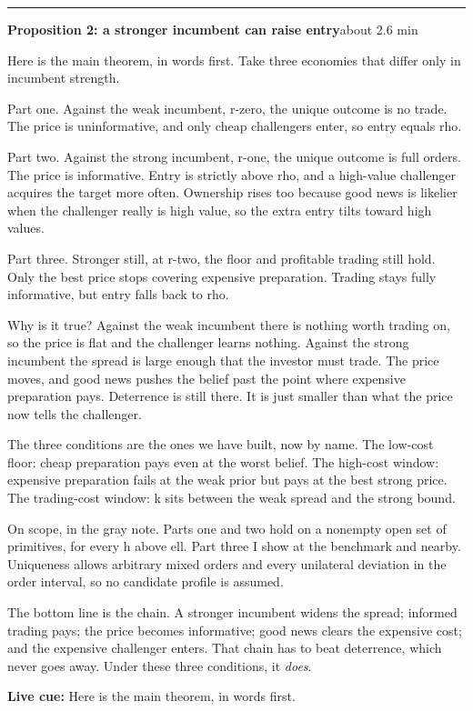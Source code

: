 \documentclass[11pt]{article}
\newcommand{\Cue}[1]{\par\nobreak\smallskip\noindent
  \textcolor{ScriptGray}{\footnotesize\textbf{Live cue:} #1}\par}
\newcommand{\scriptframe}[3]{%
  \Needspace{9\baselineskip}%
  \par\medskip\noindent\textcolor{ScriptBlue}{\rule{\linewidth}{0.55pt}}%
  \par\smallskip\noindent
  \textbf{#1}\hfill\textcolor{ScriptGray}{\small #2}\par\smallskip
  #3\par}
\begin{document}
\scriptframe{Proposition 2: a stronger incumbent can raise entry}{about 2.6 min}{%
  Here is the main theorem, in words first. Take three economies that differ
  only in incumbent strength.

  Part one. Against the weak incumbent, r-zero, the unique outcome is no trade.
  The price is uninformative, and only cheap challengers enter, so entry equals
  rho.

  Part two. Against the strong incumbent, r-one, the unique outcome is full
  orders. The price is informative. Entry is strictly above rho, and a
  high-value challenger acquires the target more often. Ownership rises too
  because good news is likelier when the challenger really is high value, so
  the extra entry tilts toward high values.

  Part three. Stronger still, at r-two, the floor and profitable trading still
  hold. Only the best price stops covering expensive preparation. Trading stays
  fully informative, but entry falls back to rho.

  Why is it true? Against the weak incumbent there is nothing worth trading on,
  so the price is flat and the challenger learns nothing. Against the strong
  incumbent the spread is large enough that the investor must trade. The price
  moves, and good news pushes the belief past the point where expensive
  preparation pays. Deterrence is still there. It is just smaller than what the
  price now tells the challenger.

  The three conditions are the ones we have built, now by name. The low-cost
  floor: cheap preparation pays even at the worst belief. The high-cost window:
  expensive preparation fails at the weak prior but pays at the best strong
  price. The trading-cost window: k sits between the weak spread and the strong
  bound.

  On scope, in the gray note. Parts one and two hold on a nonempty open set of
  primitives, for every h above ell. Part three I show at the benchmark and
  nearby. Uniqueness allows arbitrary mixed orders and every unilateral
  deviation in the order interval, so no candidate profile is assumed.

  The bottom line is the chain. A stronger incumbent widens the spread; informed
  trading pays; the price becomes informative; good news clears the expensive
  cost; and the expensive challenger enters. That chain has to beat deterrence,
  which never goes away. Under these three conditions, it \emph{does}.
  \Cue{Here is the main theorem, in words first.}
}
\end{document}
